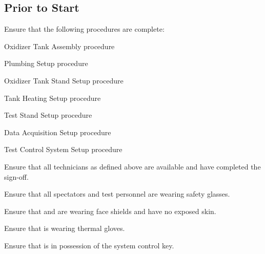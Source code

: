 \subsection{Prior to Start}
\begin{checklist}
    \item Ensure that the following procedures are complete:
    \begin{checklist}
        \item Oxidizer Tank Assembly procedure
        \item Plumbing Setup procedure
        \item Oxidizer Tank Stand Setup procedure
        \item Tank Heating Setup procedure
        \item Test Stand Setup procedure
        \item Data Acquisition Setup procedure
        \item Test Control System Setup procedure
    \end{checklist}
    \item Ensure that all technicians as defined above are available and have completed the sign-off.
    \item Ensure that all spectators and test personnel are wearing safety glasses.
    \item Ensure that \primary{} and \secondary{} are wearing face shields and have no exposed skin.
    \item Ensure that \primary{} is wearing thermal gloves.
    \item Ensure that \ops{} is in possession of the system control key.
\end{checklist}
\setcounter{checklistnum}{0}

\newpage
